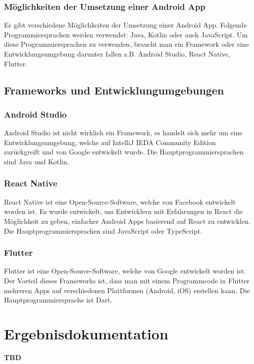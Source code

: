 \subsection{Möglichkeiten der Umsetzung einer Android App}
Es gibt verschiedene Möglichkeiten der Umsetzung einer Android App. Folgende Programmiersprachen werden verwendet: Java, Kotlin oder auch JavaScript. Um diese Programmiersprachen zu verwenden, braucht man ein Framework oder eine Entwicklungsumgebung darunter fallen z.B. Android Studio, React Native, Flutter.

\section{Frameworks und Entwicklungumgebungen}
\subsection{Android Studio}
Android Studio ist nicht wirklich ein Framework, es handelt sich mehr um eine Entwicklungsumgebung, welche auf IntelliJ IEDA Community Edition zurückgreift und von Google entwickelt wurde. Die Hauptprogrammiersprachen sind Java und Kotlin. \cite{Android Studio}

\subsection{React Native}
React Native ist eine Open-Source-Software, welche von Facebook entwickelt worden ist. Es wurde entwickelt, um Entwicklern mit Erfahrungen in React die Möglichkeit zu geben, einfacher Android Apps basierend auf React zu entwicklen. Die Hauptprogrammiersprachen sind JavaScript oder TypeScript. \cite{React Native}

\subsection{Flutter}
Flutter ist eine Open-Source-Software, welche von Google entwickelt worden ist. Der Vorteil dieses Frameworks ist, dass man mit einem Programmcode in Flutter mehreren Apps auf verschiedenen Plattformen (Android, iOS) erstellen kann. Die Hauptprogrammiersprache ist Dart. \cite{Flutter}


\chapter{Ergebnisdokumentation}
\textbf{TBD}


